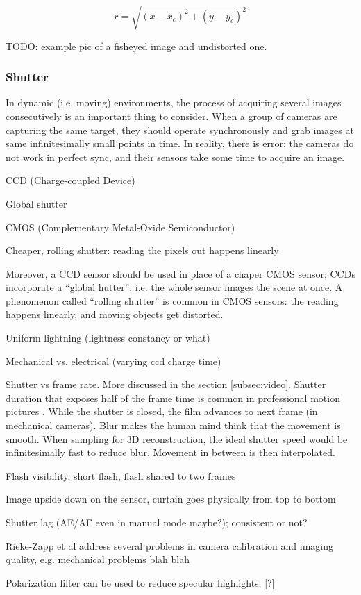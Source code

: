 \begin{equation}
r = \sqrt{(x - x_c)^2 + (y - y_c)^2}
\end{equation}

TODO: example pic of a fisheyed image and undistorted one.

\subsubsection{Shutter}

In dynamic (i.e. moving) environments, the process of acquiring several images consecutively is an important thing to consider. When a group of cameras are capturing the same target, they should operate synchronously and grab images at same infinitesimally small points in time. In reality, there is error: the cameras do not work in perfect sync, and their sensors take some time to acquire an image.

CCD (Charge-coupled Device)

Global shutter

CMOS (Complementary Metal-Oxide Semiconductor)

Cheaper, rolling shutter: reading the pixels out happens linearly

Moreover, a CCD sensor should be used in place of a chaper CMOS sensor; CCDs incorporate a ``global hutter'', i.e. the whole sensor images the scene at once. A phenomenon called ``rolling shutter'' is common in CMOS sensors: the reading happens linearly, and moving objects get distorted.

Uniform lightning (lightness constancy or what)

Mechanical vs. electrical (varying ccd charge time)

Shutter vs frame rate. More discussed in the section \ref{subsec:video}. Shutter duration that exposes half of the frame time is common in professional motion pictures \cite{wilson2004anton}. While the shutter is closed, the film advances to next frame (in mechanical cameras). Blur makes the human mind think that the movement is smooth. When sampling for 3D reconstruction, the ideal shutter speed would be infinitesimally fast to reduce blur. Movement in between is then interpolated.

Flash visibility, short flash, flash shared to two frames

Image upside down on the sensor, curtain goes physically from top to bottom

Shutter lag (AE/AF even in manual mode maybe?); consistent or not?

Rieke-Zapp et al \cite{rieke2009evaluation} address several problems in camera calibration and imaging quality, e.g. mechanical problems blah blah

Polarization filter can be used to reduce specular highlights. [?] 

